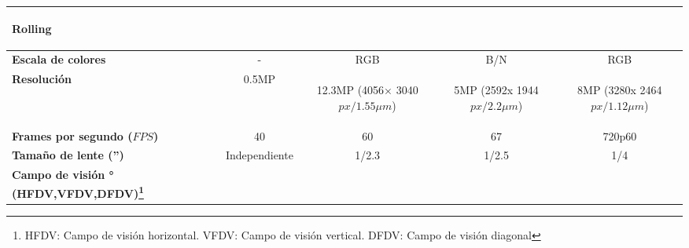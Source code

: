 \begin{itemize}
\begin{savenotes}
\begin{mytable}[H]
\begin{tabular}{l|c|c|c|c|}
\begin{minipage}{\mythirdmaxsizeofcontenttable}
\begin{myflushcenter}
						Rolling 
				\end{myflushcenter}\end{minipage} \\ \hline
				\multicolumn{1}{|l|}{
					\begin{minipage}{\myforthmaxsizeofcontenttable}	
						\textbf{Escala de colores}
					\end{minipage}
				} & - & RGB & B/N & RGB \\ \hline
				\multicolumn{1}{|l|}{
				\begin{minipage}{\myforthmaxsizeofcontenttable}	
					\textbf{Resolución}
				\end{minipage}
				} & 0.5MP & 
				\begin{minipage}{\mythirdmaxsizeofcontenttable}\begin{myflushcenter}
					12.3MP (4056× 3040 $px/1.55{\mu}m$)
				\end{myflushcenter}\end{minipage} & 
				\begin{minipage}{\mythirdmaxsizeofcontenttable}\begin{myflushcenter}
					5MP (2592x 1944 $px/2.2{\mu}m$)
				\end{myflushcenter}\end{minipage} & 
				\begin{minipage}{\mythirdmaxsizeofcontenttable}\begin{myflushcenter}
					8MP (3280x 2464 $px/1.12{\mu}m$)
				\end{myflushcenter}\end{minipage} \\ \hline
				\multicolumn{1}{|l|}{
				\begin{minipage}{\myforthmaxsizeofcontenttable}	
					\textbf{Frames por segundo ($FPS$)}
				\end{minipage}
				} & 40 %
				& 60 & 67 & 720p60 \\ \hline
				\multicolumn{1}{|l|}{
				\begin{minipage}{\myforthmaxsizeofcontenttable}	
					\textbf{Tamaño de lente ('')}
				\end{minipage}
				} & Independiente & 1/2.3 & 1/2.5 & 1/4 \\ \hline
				\multicolumn{1}{|l|}{
				\begin{minipage}{\myforthmaxsizeofcontenttable}
					\textbf{Campo de visión ° (HFDV,VFDV,DFDV)\footnote{HFDV: Campo de visión horizontal. VFDV: Campo de visión vertical. DFDV: Campo de visión diagonal}}
				\end{minipage}
}
\end{tabular}
\end{mytable}
\end{savenotes}
\end{itemize}

